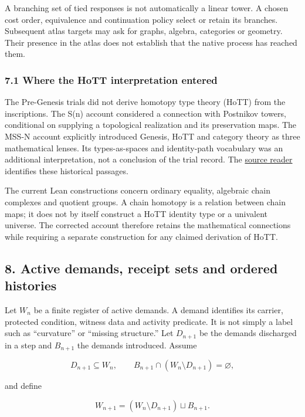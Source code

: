 \documentclass[
  11pt,
]{article}
\begin{document}
A branching set of tied responses is not automatically a linear tower. A
chosen cost order, equivalence and continuation policy select or retain
its branches. Subsequent atlas targets may ask for graphs, algebra,
categories or geometry. Their presence in the atlas does not establish
that the native process has reached them.

\subsubsection{7.1 Where the HoTT interpretation
entered}\label{where-the-hott-interpretation-entered}

The Pre-Genesis trials did not derive homotopy type theory (HoTT) from
the inscriptions. The S(n) account considered a connection with
Postnikov towers, conditional on supplying a topological realization and
its preservation maps. The MSS-N account explicitly introduced Genesis,
HoTT and category theory as three mathematical lenses. Its
types-as-spaces and identity-path vocabulary was an additional
interpretation, not a conclusion of the trial record. The
\href{docs/references.md}{source reader} identifies these historical
passages.

The current Lean constructions concern ordinary equality, algebraic
chain complexes and quotient groups. A chain homotopy is a relation
between chain maps; it does not by itself construct a HoTT identity type
or a univalent universe. The corrected account therefore retains the
mathematical connections while requiring a separate construction for any
claimed derivation of HoTT.

\subsection{8. Active demands, receipt sets and ordered
histories}\label{active-demands-receipt-sets-and-ordered-histories}

Let \(W_n\) be a finite register of active demands. A demand identifies
its carrier, protected condition, witness data and activity predicate.
It is not simply a label such as ``curvature'' or ``missing structure.''
Let \(D_{n+1}\) be the demands discharged in a step and \(B_{n+1}\) the
demands introduced. Assume

\[
D_{n+1}\subseteq W_n,\qquad
B_{n+1}\cap(W_n\setminus D_{n+1})=\varnothing,
\]

and define

\[
W_{n+1}=(W_n\setminus D_{n+1})\sqcup B_{n+1}.
\]
\end{document}
